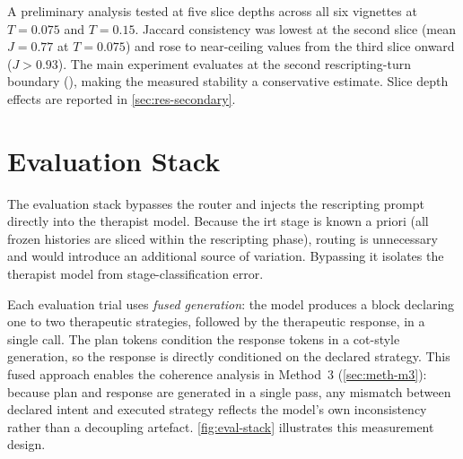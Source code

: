 A preliminary analysis tested  at five slice
depths across all six vignettes at $T = 0.075$ and $T = 0.15$. Jaccard
consistency was lowest at the second slice (mean $J = 0.77$ at $T = 0.075$)
and rose to near-ceiling values from the third slice onward ($J > 0.93$).
The main experiment evaluates at the second rescripting-turn boundary
(), making the measured stability a conservative estimate.
Slice depth effects are reported in \autoref{sec:res-secondary}.



\section{Evaluation Stack}
\label{sec:meth-eval}

The evaluation stack bypasses the router and injects the rescripting prompt
directly into the therapist model. Because the \gls{irt} stage is known a
priori (all frozen histories are sliced within the rescripting phase), routing
is unnecessary and would introduce an additional source of variation.
Bypassing it isolates the therapist model from stage-classification error.

Each evaluation trial uses \emph{fused generation}: the model produces a
 block declaring one to two therapeutic strategies, followed
by the therapeutic response, in a single call. The plan tokens condition the
response tokens in a \gls{cot}-style generation, so the response is
directly conditioned on the declared strategy. This fused approach enables
the coherence analysis in Method~3 (\autoref{sec:meth-m3}): because plan
and response are generated in a single pass, any mismatch between declared
intent and executed strategy reflects the model's own inconsistency rather
than a decoupling artefact. \autoref{fig:eval-stack} illustrates this
measurement design.

